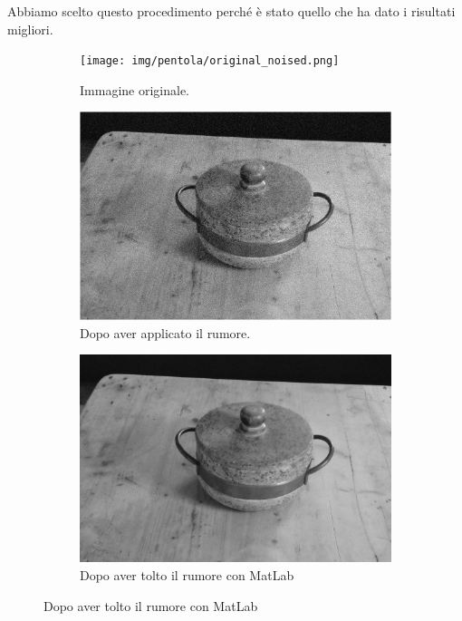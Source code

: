 \documentclass[12pt]{report}
\begin{document}
Abbiamo scelto questo procedimento perch\'e \`e stato quello che ha dato i risultati migliori.
\begin{figure}[H]
  \centering
  \begin{subfigure}[b]{0.4\linewidth}
    \centering
    \texttt{[image: img/pentola/original\_noised.png]}
    \caption{Immagine originale.}
  \end{subfigure}
  \begin{subfigure}[b]{0.4\linewidth}
    \centering
    \includegraphics[width=\linewidth]{img/pentola/noised_image.png}
    \caption{Dopo aver applicato il rumore.}
  \end{subfigure}
  \begin{subfigure}[b]{0.6\linewidth}
    \centering
    \includegraphics[width=\linewidth]{img/pentola/denoised_AI.jpg}
    \caption{Dopo aver tolto il rumore con MatLab}
  \end{subfigure}
\end{figure}
\end{document}
